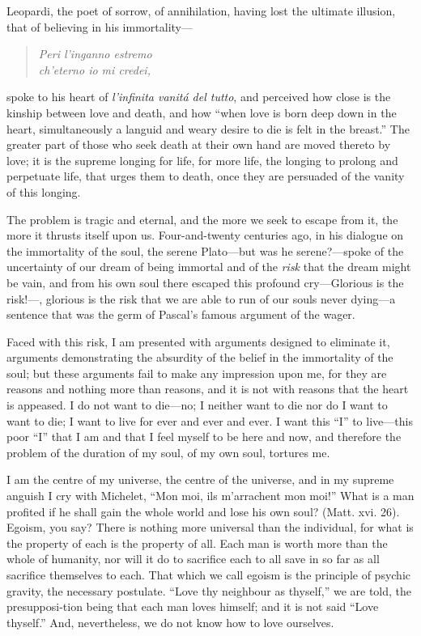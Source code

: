 Leopardi, the poet of sorrow, of annihilation, having lost the
ultimate illusion, that of believing in his immortality---

\begin{verse}
\vin\textit{Peri l'inganno estremo\\
ch'eterno io mi credei,}
\end{verse}

\noindent spoke to his heart of \textit{l'infinita vanit\'a del
tutto}, and perceived how close is the kinship between love and death,
and how ``when love is born deep down in the heart, simultaneously a
languid and weary desire to die is felt in the breast.'' The greater
part of those who seek death at their own hand are moved thereto by
love; it is the supreme longing for life, for more life, the longing
 to prolong and perpetuate life, that urges them to death,
once they are persuaded of the vanity of this longing.

The problem is tragic and eternal, and the more we seek to escape from
it, the more it thrusts itself upon us. Four-and-twenty centuries ago,
in his dialogue on the immortality of the soul, the serene
Pla\-to---but was he serene?---spoke of the uncertainty of our dream
of being immortal and of the \textit{risk} that the dream might be
vain, and from his own soul there escaped this profound cry---Glorious
is the risk!---, glorious is the risk that
we are able to run of our souls never dy\-ing---a sentence that was
the germ of Pascal's famous argument of the wager.

Faced with this risk, I am presented with arguments designed to
eliminate it, arguments demonstrating the absurdity of the belief in
the immortality of the soul; but these arguments fail to make any
impression upon me, for they are reasons and nothing more than
reasons, and it is not with reasons that the heart is appeased. I do
not want to die---no; I neither want to die nor do I want to want to
die; I want to live for ever and ever and ever. I want this ``I'' to
live---this poor ``I'' that I am and that I feel myself to be here and
now, and therefore the problem of the duration of my soul, of my own
soul, tortures me.

I am the centre of my universe, the centre of the universe, and in my
supreme anguish I cry with Michelet, ``Mon moi, ils m'arrachent mon
moi!'' What is a man profited if he shall gain the whole world and
lose his own soul? (Matt. xvi. 26). Egoism, you say? There is nothing
more universal than the individual, for what is the property of each
is the property of all. Each man is worth more than the whole of
humanity, nor will it do to sacrifice each to all save in so far as
all sacrifice themselves to each. That which we call egoism is the
principle of psychic gravity, the necessary postulate. ``Love thy
neighbour as thyself,'' we are told, the presupposi-tion
being that each man loves himself; and it is not said ``Love
thyself.'' And, nevertheless, we do not know how to love ourselves.

